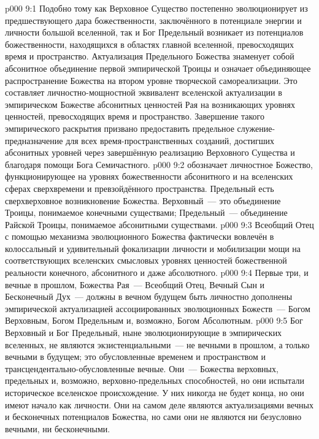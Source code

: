 \vs p000 9:1 Подобно тому как Верховное Существо постепенно эволюционирует из предшествующего дара божественности, заключённого в потенциале энергии и личности большой вселенной, так и Бог Предельный возникает из потенциалов божественности, находящихся в областях главной вселенной, превосходящих время и пространство. Актуализация Предельного Божества знаменует собой абсонитное объединение первой эмпирической Троицы и означает объединяющее распространение Божества на втором уровне творческой самореализации. Это составляет личностно\hyp{}мощностной эквивалент вселенской актуализации в эмпирическом Божестве абсонитных ценностей Рая на возникающих уровнях ценностей, превосходящих время и пространство. Завершение такого эмпирического раскрытия призвано предоставить предельное служение\hyp{}предназначение для всех время\hyp{}пространственных созданий, достигших абсонитных уровней через завершённую реализацию Верховного Существа и благодаря помощи Бога Семичастного.
\vs p000 9:2 \pc {} обозначает личностное Божество, функционирующее на уровнях божественности абсонитного и на вселенских сферах сверхвремени и превзойдённого пространства. Предельный есть сверхверховное возникновение Божества. Верховный~--- это объединение Троицы, понимаемое конечными существами; Предельный~--- объединение Райской Троицы, понимаемое абсонитными существами.
\vs p000 9:3 Всеобщий Отец с помощью механизма эволюционного Божества фактически вовлечён в колоссальный и удивительный  фокализации личности и мобилизации мощи на соответствующих вселенских смысловых уровнях ценностей божественной реальности конечного, абсонитного и даже абсолютного.
\vs p000 9:4 Первые три, и вечные в прошлом, Божества Рая~--- Всеобщий Отец, Вечный Сын и Бесконечный Дух~--- должны в вечном будущем быть личностно дополнены эмпирической актуализацией ассоциированных эволюционных Божеств~--- Богом Верховным, Богом Предельным и, возможно, Богом Абсолютным.
\vs p000 9:5 \pc Бог Верховный и Бог Предельный, ныне эволюционирующие в эмпирических вселенных, не являются экзистенциальными~--- не вечными в прошлом, а только вечными в будущем; это обусловленные временем и пространством и трансцендентально\hyp{}обусловленные вечные. Они~--- Божества верховных, предельных и, возможно, верховно\hyp{}предельных способностей, но они испытали историческое вселенское происхождение. У них никогда не будет конца, но они имеют начало как личности. Они на самом деле являются актуализациями вечных и бесконечных потенциалов Божества, но сами они не являются ни безусловно вечными, ни бесконечными.

